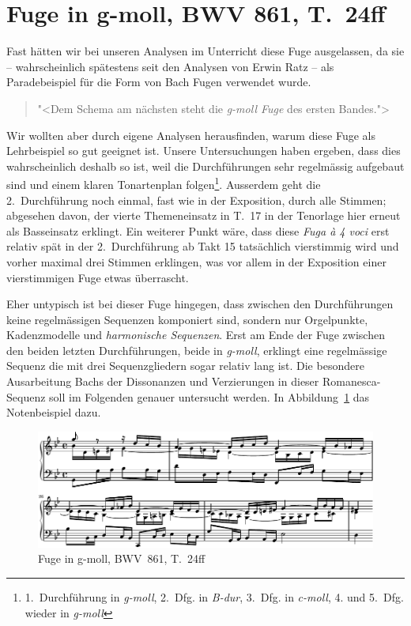 \section{Fuge in g-moll, BWV 861, T.~24ff}

Fast hätten wir bei unseren Analysen im Unterricht diese Fuge ausgelassen, da sie -- wahrscheinlich spätestens seit den Analysen von Erwin Ratz -- als Paradebeispiel für die Form von Bach Fugen verwendet wurde.

\begin{quote}
"<Dem Schema am nächsten steht die \emph{g-moll Fuge} des ersten Bandes.">\autocite[80f]{ratz:formenlehre}
\end{quote}

Wir wollten aber durch eigene Analysen herausfinden, warum diese Fuge als Lehrbeispiel so gut geeignet ist.
Unsere Untersuchungen haben ergeben, dass dies wahrscheinlich deshalb so ist, weil die Durchführungen sehr regelmässig aufgebaut sind und einem klaren Tonartenplan folgen\footnote{1.~Durchführung in \emph{g-moll}, 2.~Dfg. in \emph{B-dur}, 3.~Dfg. in \emph{c-moll}, 4. und 5.~Dfg. wieder in \emph{g-moll}}.
Ausserdem geht die 2.~Durchführung noch einmal, fast wie in der Exposition, durch alle Stimmen; abgesehen davon, der vierte Themeneinsatz in T.~17 in der Tenorlage hier erneut als Basseinsatz erklingt.
Ein weiterer Punkt wäre, dass diese \emph{Fuga à 4 voci} erst relativ spät in der 2.~Durchführung ab Takt 15 tatsächlich vierstimmig wird und vorher maximal drei Stimmen erklingen, was vor allem in der Exposition einer vierstimmigen Fuge etwas überrascht.

Eher untypisch ist bei dieser Fuge hingegen, dass zwischen den Durchführungen keine regelmässigen Sequenzen komponiert sind, sondern nur Orgelpunkte, Kadenzmodelle und \emph{harmonische Sequenzen}.
Erst am Ende der Fuge zwischen den beiden letzten Durchführungen, beide in \emph{g-moll}, erklingt eine regelmässige Sequenz die mit drei Sequenzgliedern sogar relativ lang ist.
Die besondere Ausarbeitung Bachs der Dissonanzen und Verzierungen in dieser Romanesca-Sequenz soll im Folgenden genauer untersucht werden.
In Abbildung~\ref{fig:bwv681-original} das Notenbeispiel dazu.

\begin{figure}[htbp]
	\centering
	\includegraphics{lilypond/g-moll/render/original}
	\caption{Fuge in g-moll, BWV~861, T.~24ff}
	\label{fig:bwv681-original}
\end{figure}


